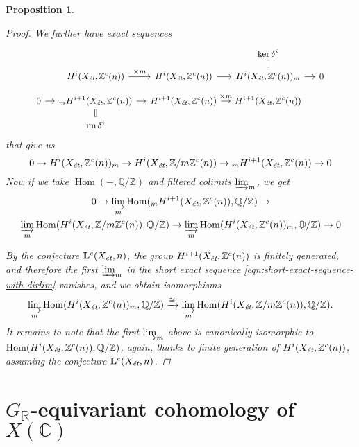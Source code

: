 \documentclass{article}
\DeclareMathOperator{\Hom}{Hom}
\DeclareMathOperator{\im}{im}
\newcommand{\CC}{\mathbb{C}}
\newcommand{\QQ}{\mathbb{Q}}
\newcommand{\RR}{\mathbb{R}}
\newcommand{\ZZ}{\mathbb{Z}}
\newcommand{\et}{\text{\it ét}}
\newtheorem{proposition}[theorem]{Proposition}
\theoremstyle{definition}
\numberwithin{equation}{section}
\begin{document}
\begin{proposition}
\begin{proof}
    We further have exact sequences
    \[ \begin{tikzcd}[row sep=0.8em,column sep=1em,font=\small]
      & & & \ker \delta^i\ar[equal]{d} \\
      & H^i (X_\et, \ZZ^c (n)) \ar{r}{\times m} & H^i (X_\et, \ZZ^c (n))\ar{r} & H^i (X_\et, \ZZ^c (n))_m \ar{r} & 0 \\
      0\ar{r} & {}_m H^{i+1} (X_\et, \ZZ^c (n)) \ar{r} & H^{i+1} (X_\et, \ZZ^c (n))\ar{r}{\times m} & H^{i+1} (X_\et, \ZZ^c (n)) \\
      & \im \delta^i\ar[equal]{u}
    \end{tikzcd} \]
    that give us
    \[ 0 \to H^i (X_\et, \ZZ^c (n))_m \to
    H^i (X_\et, \ZZ/m\ZZ^c (n)) \to
    {}_m H^{i+1} (X_\et, \ZZ^c (n)) \to 0 \]
    Now if we take $\Hom (-,\QQ/\ZZ)$ and filtered colimits $\varinjlim_m$,
    we get
    \begin{multline}
      \label{eqn:short-exact-sequence-with-dirlim}
      0 \to \varinjlim_m \Hom ({}_m H^{i+1} (X_\et, \ZZ^c (n)), \QQ/\ZZ) \to \\
      \varinjlim_m \Hom (H^i (X_\et, \ZZ/m\ZZ^c (n)), \QQ/\ZZ) \to
      \varinjlim_m \Hom (H^i (X_\et, \ZZ^c (n))_m, \QQ/\ZZ) \to 0
    \end{multline}

    By the conjecture $\mathbf{L}^c (X_\et, n)$, the group
    $H^{i+1} (X_\et, \ZZ^c (n))$ is finitely generated, and therefore
    the first $\varinjlim_m$ in the short exact sequence
    \eqref{eqn:short-exact-sequence-with-dirlim} vanishes, and we obtain
    isomorphisms
    \[ \varinjlim_m \Hom (H^i (X_\et, \ZZ^c (n))_m, \QQ/\ZZ) \xrightarrow{\cong}
    \varinjlim_m \Hom (H^i (X_\et, \ZZ/m\ZZ^c (n)), \QQ/\ZZ). \]
    It remains to note that the first $\varinjlim_m$ above is canonically
    isomorphic to $\Hom (H^i (X_\et, \ZZ^c (n)), \QQ/\ZZ)$, again,
    thanks to finite generation of $H^i (X_\et, \ZZ^c (n))$,
    assuming the conjecture $\mathbf{L}^c (X_\et, n)$.
  \end{proof}
\end{proposition}


\section{$G_\RR$-equivariant cohomology of $X (\CC)$}
\label{sec:GR-equivariant-cohomology}
\end{document}
